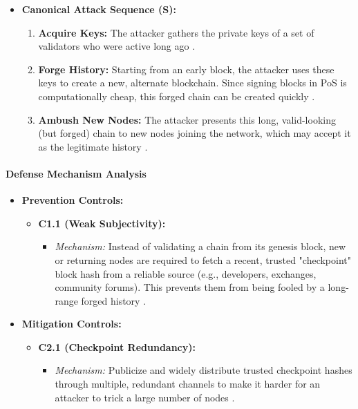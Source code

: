 \begin{itemize}
    \item \textbf{Canonical Attack Sequence (S):}
    \begin{enumerate}
        \item \textbf{Acquire Keys:} The attacker gathers the private keys of a set of validators who were active long ago \cite{wang2019}.
        \item \textbf{Forge History:} Starting from an early block, the attacker uses these keys to create a new, alternate blockchain. Since signing blocks in PoS is computationally cheap, this forged chain can be created quickly \cite{wang2019}.
        \item \textbf{Ambush New Nodes:} The attacker presents this long, valid-looking (but forged) chain to new nodes joining the network, which may accept it as the legitimate history \cite{wang2019}.
    \end{enumerate}
\end{itemize}

\paragraph{Defense Mechanism Analysis}

\begin{itemize}
    \item \textbf{Prevention Controls:}
    \begin{itemize}
        \item \textbf{C1.1 (Weak Subjectivity):}
            \begin{itemize}
                \item \textit{Mechanism:} Instead of validating a chain from its genesis block, new or returning nodes are required to fetch a recent, trusted "checkpoint" block hash from a reliable source (e.g., developers, exchanges, community forums). This prevents them from being fooled by a long-range forged history \cite{wang2019}.
            \end{itemize}
    \end{itemize}
    \item \textbf{Mitigation Controls:}
    \begin{itemize}
        \item \textbf{C2.1 (Checkpoint Redundancy):}
            \begin{itemize}
                \item \textit{Mechanism:} Publicize and widely distribute trusted checkpoint hashes through multiple, redundant channels to make it harder for an attacker to trick a large number of nodes \cite{wang2019}.
            \end{itemize}
    \end{itemize}
\end{itemize}

